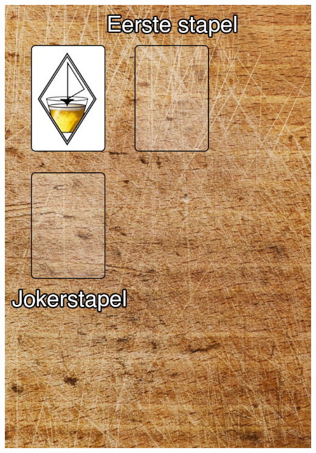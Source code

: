 \begin{minipage}[t]{.48\textwidth}
 \includegraphics[width=1\textwidth]{img/FritsPlank_Opening.png}
\end{minipage}
\hspace{0.20cm}  \vrule  \hspace{0.20cm}
